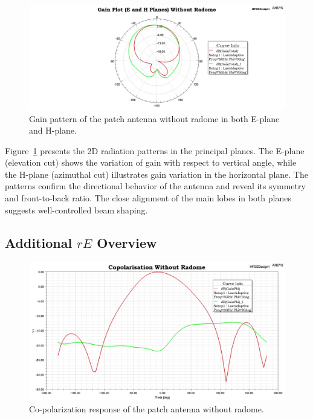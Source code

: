 \begin{figure}[H]
    \centering
    \includegraphics[width=1.0\textwidth]{figures/without_radome/Gain.jpeg}
    \caption{Gain pattern of the patch antenna without radome in both E-plane and H-plane.}
    \label{fig:res-gain-ehplane}
\end{figure}

Figure~\ref{fig:res-gain-ehplane} presents the 2D radiation patterns in the principal planes. The E-plane (elevation cut) shows the variation of gain with respect to vertical angle, while the H-plane (azimuthal cut) illustrates gain variation in the horizontal plane. The patterns confirm the directional behavior of the antenna and reveal its symmetry and front-to-back ratio. The close alignment of the main lobes in both planes suggests well-controlled beam shaping.

\subsection{Additional \texorpdfstring{$rE$}{rE} Overview}

\begin{figure}[H]
    \centering
    \includegraphics[width=1.0\textwidth]{figures/without_radome/co.jpeg}
    \caption{Co-polarization response of the patch antenna without radome.}
    \label{fig:res-co}
\end{figure}

